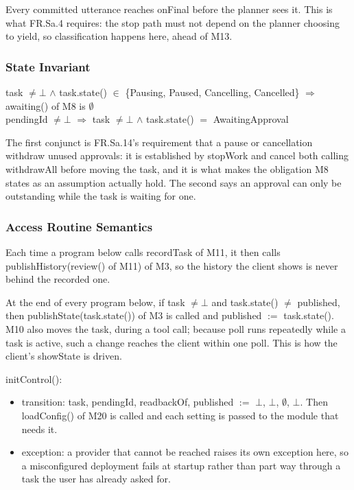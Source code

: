 \documentclass[12pt, titlepage]{article}
\newcommand{\nil}{\bot}
\begin{document}
\noindent Every committed utterance reaches onFinal before the planner sees it.
This is what FR.Sa.4 requires: the stop path must not depend on the planner
choosing to yield, so classification happens here, ahead of M13.

\subsubsection{State Invariant}

\noindent task $\neq \nil$ $\wedge$ task.state() $\in$ \{Pausing, Paused,
Cancelling, Cancelled\} $\Rightarrow$ awaiting() of M8 is $\emptyset$\\
pendingId $\neq \nil$ $\Rightarrow$ task $\neq \nil$ $\wedge$ task.state() $=$
AwaitingApproval

\noindent The first conjunct is FR.Sa.14's requirement that a pause or
cancellation withdraw unused approvals: it is established by stopWork and cancel
both calling withdrawAll before moving the task, and it is what makes the
obligation M8 states as an assumption actually hold. The second says an approval
can only be outstanding while the task is waiting for one.

\subsubsection{Access Routine Semantics}

\noindent Each time a program below calls recordTask of M11, it then calls
publishHistory(review() of M11) of M3, so the history the client shows is never
behind the recorded one.

\noindent At the end of every program below, if task $\neq \nil$ and
task.state() $\neq$ published, then publishState(task.state()) of M3 is called
and published $:=$ task.state(). M10 also moves the task, during a tool call;
because poll runs repeatedly while a task is active, such a change reaches the
client within one poll. This is how the client's showState is driven.

\noindent initControl():
\begin{itemize}
\item transition: task, pendingId, readbackOf, published $:=$ $\nil$, $\nil$,
$\emptyset$, $\nil$.
Then loadConfig() of M20 is called and each setting is passed to the module that
needs it.
\item exception: a provider that cannot be reached raises its own exception
here, so a misconfigured deployment fails at startup rather than part way
through a task the user has already asked for.
\end{itemize}
\end{document}
